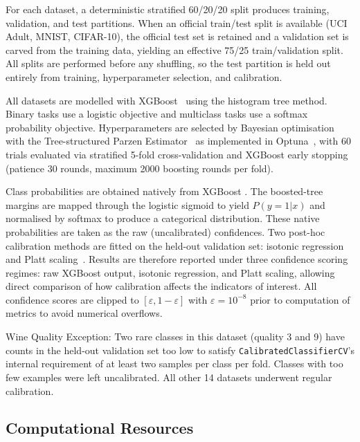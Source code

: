 \documentclass{article}
\theoremstyle{plain}
\theoremstyle{definition}
\theoremstyle{remark}
\begin{document}
For each dataset, a deterministic stratified 60/20/20 split produces training, validation, and test partitions. When an official train/test split is available (UCI Adult, MNIST, CIFAR-10), the official test set is retained and a validation set is carved from the training data, yielding an effective 75/25 train/validation split. All splits are performed before any shuffling, so the test partition is held out entirely from training, hyperparameter selection, and calibration.

All datasets are modelled with XGBoost~\cite{chen2016xgboost} using the histogram tree method. Binary tasks use a logistic objective and multiclass tasks use a softmax probability objective. Hyperparameters are selected by Bayesian optimisation with the Tree-structured Parzen Estimator~\cite{bergstra2011algorithms} as implemented in Optuna~\cite{akiba2019optuna}, with 60 trials evaluated via stratified 5-fold cross-validation and XGBoost early stopping (patience 30 rounds, maximum 2000 boosting rounds per fold).

Class probabilities are obtained natively from XGBoost \cite{chen2016xgboost,pedregosa2011scikitlearn}. The boosted-tree margins are mapped through the logistic sigmoid to yield $P(y = 1 | x)$ and normalised by softmax to produce a categorical distribution. These native probabilities are taken as the raw (uncalibrated) confidences. Two post-hoc calibration methods are fitted on the held-out validation set: isotonic regression~\cite{zadrozny2002transforming} and Platt scaling~\cite{platt1999probabilistic}. Results are therefore reported under three confidence scoring regimes: raw XGBoost output, isotonic regression, and Platt scaling, allowing direct comparison of how calibration affects the indicators of interest. All confidence scores are clipped to $[\varepsilon, 1-\varepsilon]$ with $\varepsilon = 10^{-8}$ prior to computation of metrics to avoid numerical overflows. 

Wine Quality Exception: Two rare classes in this dataset (quality 3 and 9) have counts in the held-out validation set too low to satisfy  \texttt{CalibratedClassifierCV}'s internal requirement of at least two samples per class per fold. Classes with too few examples were left uncalibrated. All other 14 datasets underwent regular calibration.

\subsection{Computational Resources}
\end{document}
